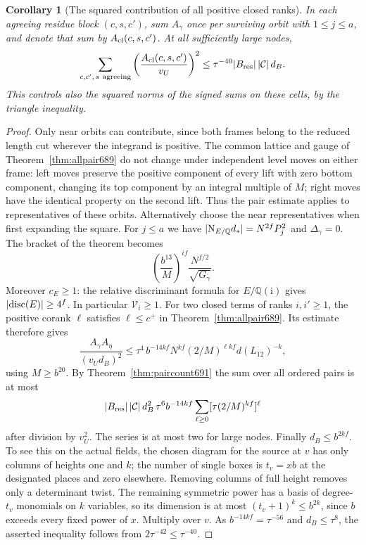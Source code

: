 \documentclass[a4paper,11pt]{article}
\newtheorem{corollary}[proposition]{Corollary}
\theoremstyle{definition}
\theoremstyle{remark}
\numberwithin{equation}{section}
\begin{document}
\begin{corollary}[The squared contribution of all positive closed ranks]
\leavevmode\label{cor:closedmoment693}
In each agreeing residue block \((c,s,c')\), sum \(A_\gamma\)
once per surviving orbit with \(1\le j\le a\), and denote that
sum by \(A_{\rm cl}(c,s,c')\). At all sufficiently large nodes,
\[
       \sum_{c,c',\,s\ {\rm agreeing}}
                \left(\frac{A_{\rm cl}(c,s,c')}{v_U}\right)^2
         \le \tau^{-40}|B_{\rm res}|\,|\mathcal C|\,d_B .
\]
This controls also the squared norms of the signed sums on
these cells, by the triangle inequality.
\end{corollary}
\begin{proof}
Only near orbits can contribute, since both frames belong to
the reduced length cut wherever the integrand is positive.
The common lattice and gauge of Theorem~\ref{thm:allpair689}
do not change under independent level moves on either frame:
left moves preserve the positive component of every lift with
zero bottom component, changing its top component by an
integral multiple of \(M\); right moves have the identical
property on the second lift. Thus the pair estimate applies
to representatives of these orbits. Alternatively choose
the near representatives when first expanding the square.
For \(j\le a\) we have \(|{\rm N}_{E/\mathbb Q}d_*|=N^{2f}P_j^2\)
and \(\Delta_\gamma=0\). The bracket of the theorem becomes
\[
        \left(\frac{b^{13}}{M}\right)^{if}
                          \frac{N^{f/2}}{\sqrt{G_\gamma}} .
\]
Moreover \(c_E\ge1\): the relative discriminant formula for
\(E/\mathbb Q(\mathrm i)\) gives \(|{\rm disc}(E)|\ge4^f\).
In particular \(\mathcal V_i\ge1\). For two closed terms
of ranks \(i,i'\ge1\), the positive corank \(\ell\) satisfies
\(\ell\le c^+\) in Theorem~\ref{thm:allpair689}. Its estimate
therefore gives
\[
 \frac{A_\gamma A_\eta}{(v_Ud_B)^2}
 \le \tau^4\, b^{-14kf} N^{kf}
           (2/M)^{\ell kf}d(L_{12})^{-k},
\]
using \(M\ge b^{20}\). By Theorem~\ref{thm:paircount691}
the sum over all ordered pairs is at most
\[
 |B_{\rm res}|\,|\mathcal C|\,d_B^2\,\tau^6 b^{-14kf}
          \sum_{\ell\ge0}[\tau(2/M)^{kf}]^\ell
\]
after division by \(v_U^2\). The series is at most two for
large nodes. Finally \(d_B\le b^{2kf}\). To see this on the
actual fields, the chosen diagram for the source at \(v\)
has only columns of heights one and \(k\); the number of
single boxes is \(t_v=xb\) at the designated places and zero
elsewhere. Removing columns of full height removes only a
determinant twist. The remaining symmetric power has a basis
of degree-\(t_v\) monomials on \(k\) variables, so its
dimension is at most \((t_v+1)^k\le b^{2k}\), since \(b\)
exceeds every fixed power of \(x\). Multiply over \(v\).
As \(b^{-14kf}=\tau^{-56}\) and \(d_B\le\tau^8\), the
asserted inequality follows from \(2\tau^{-42}\le\tau^{-40}\).
\end{proof}
\end{document}
